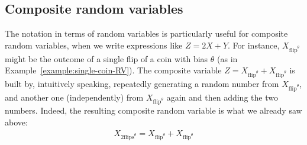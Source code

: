 \documentclass[nobib,nofonts]{tufte-handout}
\renewcommand{\markdef}[1]{\emph{#1}}
\begin{document}
\subsection{Composite random variables}

The notation in terms of random variables is particularly useful for composite random variables, when we write expressions like $Z = 2X + Y$.
For instance, $X_{\text{flip}^{\theta}}$ might be the outcome of a single flip of a coin with bias $\theta$ (as in Example~\ref{example:single-coin-RV}).
The composite variable $Z = X_{\text{flip}^{\theta}} + X_{\text{flip}^{\theta}}$ is built by, intuitively speaking, repeatedly generating a random number from $X_{\text{flip}^{\theta}}$, and another one (independently) from $X_{\text{flip}^{\theta}}$ again and then adding the two numbers.
Indeed, the resulting composite random variable is what we already saw above:
\begin{align*}
  X_{\text{2flips}^{\theta}} = X_{\text{flip}^{\theta}} + X_{\text{flip}^{\theta}}
\end{align*}


\end{document}
